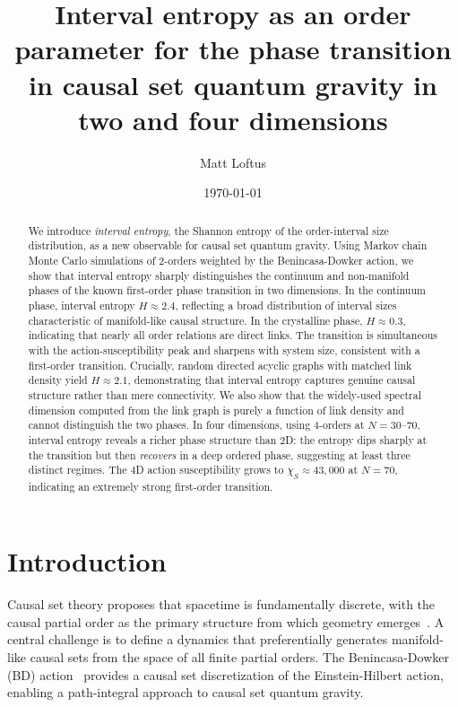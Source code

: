 \documentclass[aps,prd,twocolumn,superscriptaddress,nofootinbib]{revtex4-2}
\begin{document}
\title{Interval entropy as an order parameter for the phase transition\\in causal set quantum gravity in two and four dimensions}

\author{Matt Loftus}

\date{\today}

\begin{abstract}
We introduce \emph{interval entropy}, the Shannon entropy of the order-interval size distribution, as a new observable for causal set quantum gravity. Using Markov chain Monte Carlo simulations of 2-orders weighted by the Benincasa-Dowker action, we show that interval entropy sharply distinguishes the continuum and non-manifold phases of the known first-order phase transition in two dimensions. In the continuum phase, interval entropy $H \approx 2.4$, reflecting a broad distribution of interval sizes characteristic of manifold-like causal structure. In the crystalline phase, $H \approx 0.3$, indicating that nearly all order relations are direct links. The transition is simultaneous with the action-susceptibility peak and sharpens with system size, consistent with a first-order transition. Crucially, random directed acyclic graphs with matched link density yield $H \approx 2.1$, demonstrating that interval entropy captures genuine causal structure rather than mere connectivity. We also show that the widely-used spectral dimension computed from the link graph is purely a function of link density and cannot distinguish the two phases. In four dimensions, using 4-orders at $N = 30$--$70$, interval entropy reveals a richer phase structure than 2D: the entropy dips sharply at the transition but then \emph{recovers} in a deep ordered phase, suggesting at least three distinct regimes. The 4D action susceptibility grows to $\chi_S \approx 43{,}000$ at $N = 70$, indicating an extremely strong first-order transition.
\end{abstract}

\maketitle

\section{Introduction}

Causal set theory proposes that spacetime is fundamentally discrete, with the causal partial order as the primary structure from which geometry emerges~\cite{bombelli1987,surya2019}. A central challenge is to define a dynamics that preferentially generates manifold-like causal sets from the space of all finite partial orders. The Benincasa-Dowker (BD) action~\cite{benincasa2010} provides a causal set discretization of the Einstein-Hilbert action, enabling a path-integral approach to causal set quantum gravity.
\end{document}
